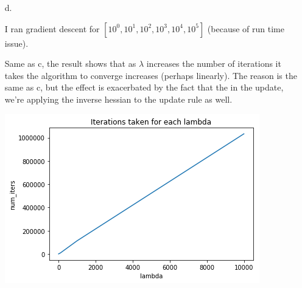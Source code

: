 \documentclass[11pt]{article}
\theoremstyle{remark}
\begin{document}
\begin{itemize}
\item[d.] 

I ran gradient descent for $[10^0,10^1,10^2,10^3,10^4,10^5]$ (because of run time issue).

Same as c, the result shows that as $\lambda$ increases the number of iterations it takes the algorithm to converge increases (perhaps linearly). The reason is the same as c, but the effect is exacerbated by the fact that the in the update, we're applying the inverse hessian to the update rule as well.

\includegraphics[scale=0.7]{im2}



\end{itemize}
\color{black}
\end{document}
